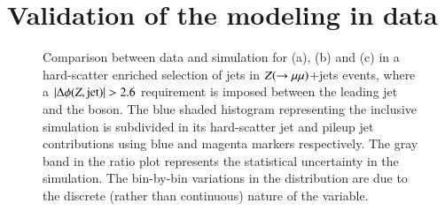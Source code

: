 \documentclass{atlasnote}
\begin{document}
\section{Validation of the modeling in data}
\label{sec:JVTvalidation}
\begin{figure}[!htbp]
  \centering
  \caption{Comparison between data and simulation for \cJVF (a), \RpT (b) and \JVT (c) in a hard-scatter enriched selection of jets in $Z(\rightarrow\mu\mu)$+jets events,
      where a $|\Delta \phi(\Zboson, {\rm jet})|>2.6$ requirement is imposed between the leading jet and the \Zboson boson.
  The blue shaded histogram representing the inclusive simulation is subdivided in its hard-scatter jet and pileup jet contributions
  using blue and magenta markers respectively.  
  The gray band in the ratio plot represents the statistical uncertainty in the simulation. The bin-by-bin variations in the \JVT distribution are due to the discrete (rather than continuous) nature of the variable.}
  \label{fig:Zmumu_HS}
\end{figure}
\end{document}
